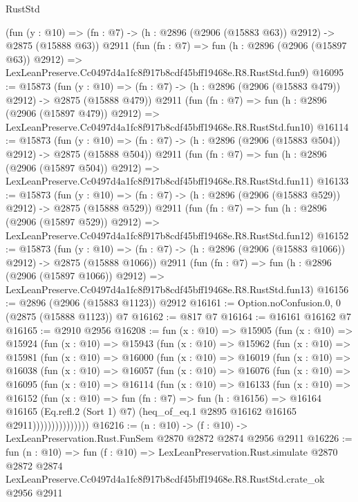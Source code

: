 \begin{lexlean}{RustStd}
\begin{coremodule}
    (fun (y : @10) => (fn : @7) -> (h : @2896 (@2906 (@15883 @63)) @2912) -> @2875 (@15888 @63))
    @2911
    (fun (fn : @7) =>
    fun (h : @2896 (@2906 (@15897 @63)) @2912) =>
    LexLeanPreserve.Cc0497d4a1fc8f917b8cdf45bff19468e.R8.RustStd.fun9)
@16095 := @15873
    (fun (y : @10) => (fn : @7) -> (h : @2896 (@2906 (@15883 @479)) @2912) -> @2875 (@15888 @479))
    @2911
    (fun (fn : @7) =>
    fun (h : @2896 (@2906 (@15897 @479)) @2912) =>
    LexLeanPreserve.Cc0497d4a1fc8f917b8cdf45bff19468e.R8.RustStd.fun10)
@16114 := @15873
    (fun (y : @10) => (fn : @7) -> (h : @2896 (@2906 (@15883 @504)) @2912) -> @2875 (@15888 @504))
    @2911
    (fun (fn : @7) =>
    fun (h : @2896 (@2906 (@15897 @504)) @2912) =>
    LexLeanPreserve.Cc0497d4a1fc8f917b8cdf45bff19468e.R8.RustStd.fun11)
@16133 := @15873
    (fun (y : @10) => (fn : @7) -> (h : @2896 (@2906 (@15883 @529)) @2912) -> @2875 (@15888 @529))
    @2911
    (fun (fn : @7) =>
    fun (h : @2896 (@2906 (@15897 @529)) @2912) =>
    LexLeanPreserve.Cc0497d4a1fc8f917b8cdf45bff19468e.R8.RustStd.fun12)
@16152 := @15873
    (fun (y : @10) => (fn : @7) -> (h : @2896 (@2906 (@15883 @1066)) @2912) -> @2875 (@15888 @1066))
    @2911
    (fun (fn : @7) =>
    fun (h : @2896 (@2906 (@15897 @1066)) @2912) =>
    LexLeanPreserve.Cc0497d4a1fc8f917b8cdf45bff19468e.R8.RustStd.fun13)
@16156 := @2896 (@2906 (@15883 @1123)) @2912
@16161 := Option.noConfusion.{0, 0} (@2875 (@15888 @1123)) @7
@16162 := @817 @7
@16164 := @16161 @16162 @7
@16165 := @2910 @2956
@16208 := fun (x : @10) =>
  @15905
    (fun (x : @10) =>
    @15924
      (fun (x : @10) =>
      @15943
        (fun (x : @10) =>
        @15962
          (fun (x : @10) =>
          @15981
            (fun (x : @10) =>
            @16000
              (fun (x : @10) =>
              @16019
                (fun (x : @10) =>
                @16038
                  (fun (x : @10) =>
                  @16057
                    (fun (x : @10) =>
                    @16076
                      (fun (x : @10) =>
                      @16095
                        (fun (x : @10) =>
                        @16114
                          (fun (x : @10) =>
                          @16133
                            (fun (x : @10) =>
                            @16152
                              (fun (x : @10) =>
                              fun (fn : @7) =>
                              fun (h : @16156) =>
                              @16164
                                @16165
                                (Eq.refl.{2} (Sort 1) @7)
                                (heq_of_eq.{1} @2895 @16162 @16165 @2911)))))))))))))))
@16216 := (n : @10) -> (f : @10) -> LexLeanPreservation.Rust.FunSem @2870 @2872 @2874 @2956 @2911
@16226 := fun (n : @10) =>
  fun (f : @10) =>
  LexLeanPreservation.Rust.simulate
    @2870
    @2872
    @2874
    LexLeanPreserve.Cc0497d4a1fc8f917b8cdf45bff19468e.R8.RustStd.crate_ok
    @2956
    @2911
\end{coremodule}
\end{lexlean}
